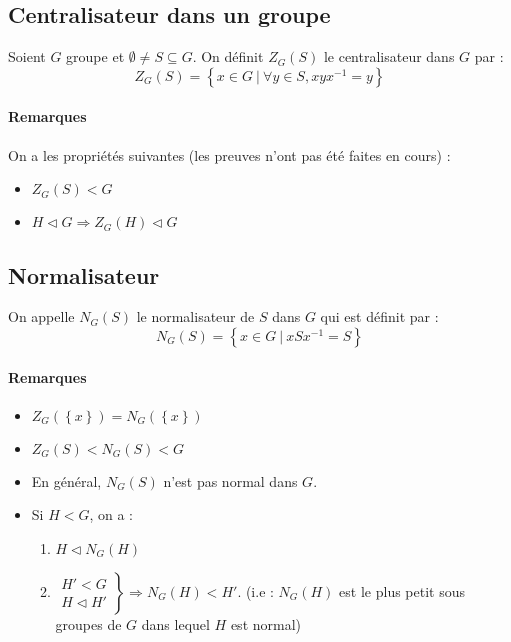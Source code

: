 \documentclass[a4paper,10pt]{report}
\newcommand{\set}[1]{\left\lbrace #1 \right\rbrace } %
\newcommand{\so}{\Rightarrow}
\newcommand{\mfootnote}[1]{\up{(}\footnote{#1}\up{)}}
\newcommand{\such}{\ \Big| \ }
\begin{document}
   \subsection{Centralisateur dans un groupe}
    Soient $G$ groupe et $\emptyset \neq S \subseteq G$. On définit
    $Z_G(S)$ le centralisateur dans $G$ par :
    $$Z_G(S)=\set{x \in G \such \forall y \in S, xyx^{-1}=y}$$
   
    \paragraph{Remarques} On a les propriétés suivantes (les preuves n'ont pas
    été faites en cours) : 
    \begin{comment}
      \mfootnote{Idées de preuve : 15/10/08 p2} 
    \end{comment}
    \begin{itemize}
      \item $Z_G(S) < G$
      \item $H \triangleleft G \so Z_G(H) \triangleleft G$
    \end{itemize}

   \subsection{Normalisateur} 
    On appelle $N_G(S)$ le normalisateur de $S$ dans $G$ qui est définit par :
    $$N_G(S)=\set{x\in G \such xSx^{-1}=S}$$
    \paragraph{Remarques} 
    \begin{itemize}
      \item $Z_G(\set{x})=N_G(\set{x})$	
      \item $Z_G(S) < N_G(S) < G$
      \item En général, $N_G(S)$ n'est pas normal dans $G$.	
      \item Si $H < G$, on a :
	\begin{enumerate}
	  \item $H \triangleleft N_G(H)$
	  \item $\left.
	    \begin{array}{r}
	      H' < G\\
	      H \triangleleft H'
	    \end{array}\right\}
	    \so N_G(H) < H'
	    $. (i.e : $N_G(H)$ est le plus petit sous groupes de $G$ dans lequel
	    $H$ est normal)
	\end{enumerate}
    \end{itemize}
\end{document}
